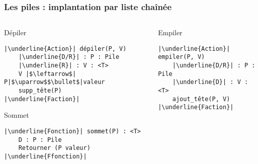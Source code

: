 \documentclass[table,handout,tikz,12pt,svgnames]{beamer}
\begin{document}
\begin{frame}[fragile=singleslide]
	\frametitle{Les piles : implantation par liste chaînée}
	\begin{block}{}
		\begin{columns}[T]
			\hspace{-0.5cm}
			\begin{column}{0.7\textwidth}
				\begin{block}{Dépiler} %
					\begin{verbatim}
|\underline{Action}| dépiler(P, V)
	|\underline{D/R}| : P : Pile
	|\underline{R}| : V : <T>
	V |$\leftarrow$| P|$\uparrow$$\bullet$|valeur
	supp_tête(P)
|\underline{Faction}|
					\end{verbatim}
				\end{block}
				\begin{block}{Sommet} %
					\begin{verbatim}
|\underline{Fonction}| sommet(P) : <T>
	D : P : Pile
	Retourner (P valeur)
|\underline{Ffonction}|
					\end{verbatim}
				\end{block}
			\end{column}
			\hspace{-1.3cm}
			\vrule{}
			\hspace{0.3cm}
			\begin{column}{0.38\textwidth}
				\begin{block}{Empiler} %
					\begin{verbatim}
|\underline{Action}| empiler(P, V)
	|\underline{D/R}| : P : Pile
	|\underline{D}| : V : <T>
	ajout_tête(P, V)
|\underline{Faction}|
					\end{verbatim}
				\end{block}		
			\end{column}
		\end{columns}
	\end{block}
\end{frame}
\end{document}
